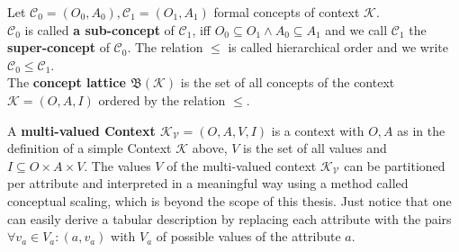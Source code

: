 Let $\mathcal{C}_0 = (O_0, A_0), \mathcal{C}_1 =(O_1, A_1)$ formal concepts of context $\mathcal{K}$.\\
$\mathcal{C}_0$ is called \textbf{a sub-concept} of $\mathcal{C}_1$, iff $O_0 \subseteq O_1 \wedge A_0 \subseteq A_1$ and we call $\mathcal{C}_1$ the \textbf{super-concept} of $\mathcal{C}_0$. The relation $\leq$ is called hierarchical order and we write $\mathcal{C}_0 \leq \mathcal{C}_1$.  \\
The \textbf{concept lattice $\mathfrak{B}(\mathcal{K})$} is the set of all concepts of the context $\mathcal{K} =(O, A, I)$ ordered by the relation $\leq$. \\


A \textbf{multi-valued Context $\mathcal{K_V} = (O, A, V, I)$} is a context with $O, A$ as in the definition of a simple Context $\mathcal{K}$ above, $V$ is the set of all values and $I \subseteq O \times A \times V$. The values $V$ of the multi-valued context $\mathcal{K_V}$ can be partitioned per attribute and interpreted in a meaningful way using a method called conceptual scaling, which is beyond the scope of this thesis. Just notice that one can easily derive a tabular description by replacing each attribute with the pairs $\forall v_a \in V_a: (a, v_a)$ with $V_a$ of possible values of the attribute $a$. \\

